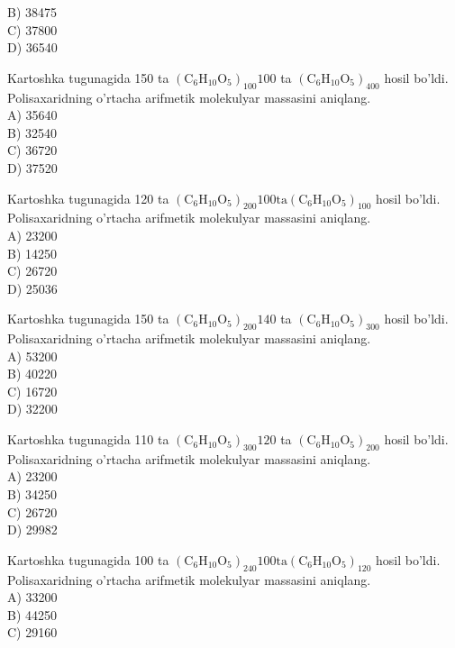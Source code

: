 B) 38475\\
C) 37800\\
D) 36540
  \item Kartoshka tugunagida 150 ta $\left(\mathrm{C}_{6} \mathrm{H}_{10} \mathrm{O}_{5}\right)_{100} 100$ ta $\left(\mathrm{C}_{6} \mathrm{H}_{10} \mathrm{O}_{5}\right)_{400}$ hosil bo'ldi. Polisaxaridning o'rtacha arifmetik molekulyar massasini aniqlang.\\
A) 35640\\
B) 32540\\
C) 36720\\
D) 37520
  \item Kartoshka tugunagida 120 ta $\left(\mathrm{C}_{6} \mathrm{H}_{10} \mathrm{O}_{5}\right)_{200} 100 \mathrm{ta}\left(\mathrm{C}_{6} \mathrm{H}_{10} \mathrm{O}_{5}\right)_{100}$ hosil bo'ldi. Polisaxaridning o'rtacha arifmetik molekulyar massasini aniqlang.\\
A) 23200\\
B) 14250\\
C) 26720\\
D) 25036
  \item Kartoshka tugunagida 150 ta $\left(\mathrm{C}_{6} \mathrm{H}_{10} \mathrm{O}_{5}\right)_{200} 140$ ta $\left(\mathrm{C}_{6} \mathrm{H}_{10} \mathrm{O}_{5}\right)_{300}$ hosil bo'ldi. Polisaxaridning o'rtacha arifmetik molekulyar massasini aniqlang.\\
A) 53200\\
B) 40220\\
C) 16720\\
D) 32200
  \item Kartoshka tugunagida 110 ta $\left(\mathrm{C}_{6} \mathrm{H}_{10} \mathrm{O}_{5}\right)_{300} 120$ ta $\left(\mathrm{C}_{6} \mathrm{H}_{10} \mathrm{O}_{5}\right)_{200}$ hosil bo'ldi. Polisaxaridning o'rtacha arifmetik molekulyar massasini aniqlang.\\
A) 23200\\
B) 34250\\
C) 26720\\
D) 29982
  \item Kartoshka tugunagida 100 ta $\left(\mathrm{C}_{6} \mathrm{H}_{10} \mathrm{O}_{5}\right)_{240} 100 \mathrm{ta}\left(\mathrm{C}_{6} \mathrm{H}_{10} \mathrm{O}_{5}\right)_{120}$ hosil bo'ldi. Polisaxaridning o'rtacha arifmetik molekulyar massasini aniqlang.\\
A) 33200\\
B) 44250\\
C) 29160\\
